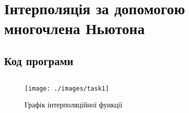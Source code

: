 \section{Інтерполяція за допомогою многочлена Ньютона}
\label{sec:interpolation}

\subsection{Код програми}
\label{subsec:code}

\inputminted{python}{../src/task1.py}

\begin{figure}[!ht]
    \centering
    \texttt{[image: ./images/task1]}
    \caption{Графік інтерполяційної функції}
    \label{fig:graph}
\end{figure}
